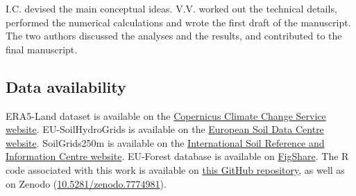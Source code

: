 I.C. devised the main conceptual ideas. V.V. worked out the technical
details, performed the numerical calculations and wrote the first draft
of the manuscript. The two authors discussed the analyses and the
results, and contributed to the final manuscript.

\subsection{Data availability}\label{data-availability}

ERA5-Land dataset is available on the
\href{https://cds.climate.copernicus.eu/cdsapp\#!/dataset/reanalysis-era5-land?tab=overview}{Copernicus
Climate Change Service website}. EU-SoilHydroGrids is available on the
\href{https://esdac.jrc.ec.europa.eu/content/3d-soil-hydraulic-database-europe-1-km-and-250-m-resolution}{European
Soil Data Centre website}. SoilGrids250m is available on the
\href{https://www.isric.org/explore/soilgrids}{International Soil
Reference and Information Centre website}. EU-Forest database is
available on
\href{https://figshare.com/collections/A_high-resolution_pan-European_tree_occurrence_dataset/3288407}{FigShare}.
The R code associated with this work is available on
\href{https://github.com/vvandermeersch/inverse_calibration}{this GitHub
repository}, as well as on Zenodo
(\href{https://doi.org/10.5281/zenodo.7774981}{10.5281/zenodo.7774981}).